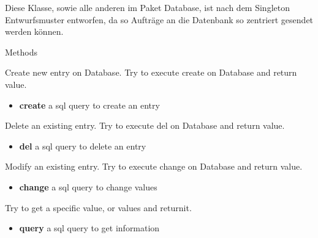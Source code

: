 Diese Klasse, sowie alle anderen im Paket Database, ist nach dem Singleton Entwurfsmuster entworfen, da so Aufträge an die Datenbank so zentriert gesendet werden können.

\begin{methodenv}{Methods}
	
	 Create new entry on Database. Try to execute create on Database and return value.
	
	\begin{itemize}
		\item \textbf{create} 
		a sql query to create an entry
	\end{itemize}
	
	 Delete an existing entry. Try to execute del on Database and return value.
	
	\begin{itemize}
		\item \textbf{del} 
		a sql query to delete an entry
	\end{itemize}
	
	 Modify an existing entry. Try to execute change on Database and return value.
	
	\begin{itemize}
		\item \textbf{change} 
		a sql query to change values
	\end{itemize}

	 Try to get a specific value, or values and returnit.

	\begin{itemize}
		\item \textbf{query} 
		a sql query to get information
	\end{itemize}
	
\end{methodenv}

\newpage